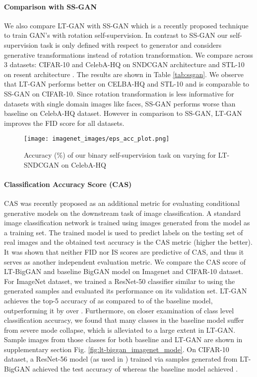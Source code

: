 \documentclass[10pt,twocolumn,letterpaper]{article}
\begin{document}
\paragraph{Comparison with SS-GAN}
We also compare LT-GAN with SS-GAN \cite{rot_ssgan2019chen} which is a recently proposed technique to train GAN's with rotation self-supervision. In contrast to SS-GAN our self-supervision task is only defined with respect to generator and considers generative transformations instead of rotation transformation. We compare across 3 datasets: CIFAR-10 and CelebA-HQ on SNDCGAN architecture and STL-10 on resent architecture \cite{sngan_proj}. The results are shown in Table \ref{tab:ssgan}. We observe that LT-GAN performs better on CELBA-HQ and STL-10 and is comparable to SS-GAN on CIFAR-10. Since rotation transformation is less informative for datasets with single domain images like faces, SS-GAN performs worse than baseline on CelebA-HQ dataset. However in comparison to SS-GAN, LT-GAN improves the FID score for all datasets. 

\begin{figure}[t]
\centering
    \texttt{[image: imagenet\_images/eps\_acc\_plot.png]}
    \caption{\footnotesize{Accuracy (\%) of our binary self-supervision task on varying  for LT-SNDCGAN on CelebA-HQ}}
    \label{fig:eps_acc_plot}
\end{figure}


\paragraph{Classification Accuracy Score (CAS)}
CAS \cite{cas2019metric} was recently proposed as an additional metric for evaluating conditional generative models on the downstream task of image classification. A standard image classification network is trained using images generated from the model as a training set. The trained model is used to predict labels on the testing set of real images and the obtained test accuracy is the CAS metric (higher the better). It was shown that neither FID \cite{fid2017martin} nor IS\cite{inception2016} scores are predictive of CAS, and thus it serves as another independent evaluation metric. We compare the CAS score of LT-BigGAN and baseline BigGAN model on Imagenet and CIFAR-10 dataset. For ImageNet dataset, we trained a ResNet-50 \cite{resnet2015He} classifier similar to \cite{cas2019metric} using the generated samples and evaluated its performance on its validation set. LT-GAN achieves the top-5 accuracy of  as compared to  of the baseline model, outperforming it by over . Furthermore, on closer examination of class level classification accuracy, we found that many classes in the baseline model suffer from severe mode collapse, which is alleviated to a large extent in LT-GAN. Sample images from those classes for both baseline and LT-GAN are shown in supplementary section Fig. \ref{fig:lt-biggan_imagenet_mode}. On CIFAR-10 dataset, a ResNet-56 model (as used in \cite{cas2019metric}) trained via samples generated from LT-BigGAN achieved the test accuracy of  whereas the baseline model achieved . 
\end{document}
